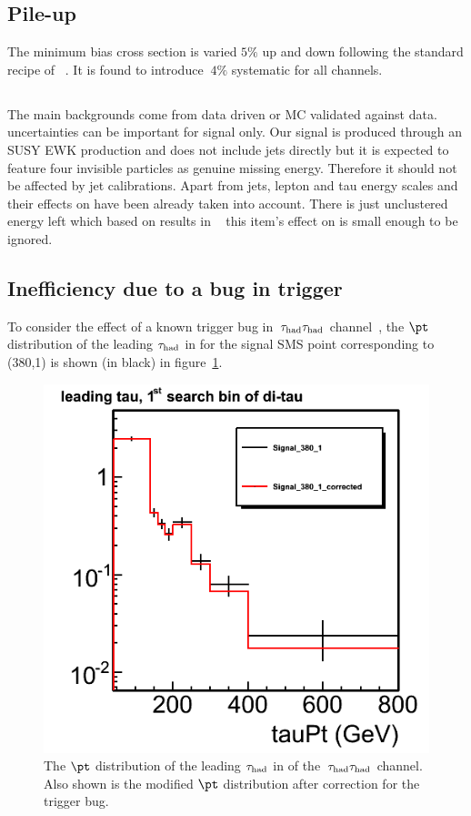 \subsection{Pile-up}
The minimum bias cross section is varied $5 \%$ up and down following the standard recipe of ~\cite{PU_SYS}. It is found to introduce $~4 \%$ systematic for all channels.    

\subsection{\texorpdfstring{\MPT}{MET}}
The main backgrounds come from data driven or MC validated against data. \MPT uncertainties can be important for signal only. Our signal is produced through an SUSY EWK production and does not include jets directly but it is expected to feature four invisible particles as genuine missing energy. Therefore it should not be affected by jet calibrations. Apart from jets, lepton and tau energy scales and their effects on \MPT have been already taken into account. There is just unclustered energy left which based on results in ~\cite{CMS_AN_2014-099} this item's effect on \MPT is small enough to be ignored.



\subsection{\texorpdfstring{Inefficiency due to a bug in \Tau trigger}{Inefficiency due to a bug in tau trigger}}
To consider the effect of a known trigger bug in $\,\tau_{\rm had}\tau_{\rm had}$ channel~\cite{CMS_AN_2014-074}, the $\pt$ 
distribution of the leading $\tau_{\rm had}$ in \binone for the signal SMS point corresponding to (380,1) is shown (in black) in figure~\ref{fig:tauPt}.
\begin{figure}[!Hhtb]
\centering
\includegraphics[angle=0,scale=0.35]{TauTauFigs/leadingTauPt.png}
\caption{The $\pt$ distribution of the leading $\tau_{\rm had}$ in \binone of the $\,\tau_{\rm had}\tau_{\rm had}$ channel. Also shown is the modified $\pt$ distribution after correction for the trigger bug.}
\label{fig:tauPt}
\end{figure}

